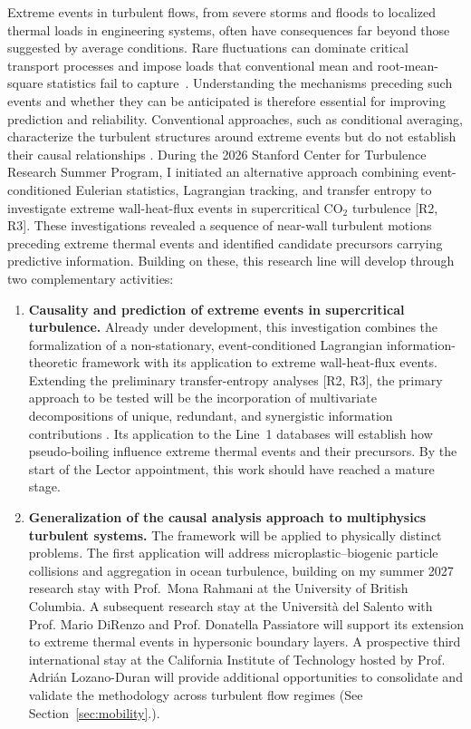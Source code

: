\documentclass[11pt]{article}
\begin{document}
Extreme events in turbulent flows, from severe storms and floods to localized thermal loads in engineering systems, often have consequences far beyond those suggested by average conditions.
Rare fluctuations can dominate critical transport processes and impose loads that conventional mean and root-mean-square statistics fail to capture~\cite{Guerrero2020}.
Understanding the mechanisms preceding such events and whether they can be anticipated is therefore essential for improving prediction and reliability.
Conventional approaches, such as conditional averaging, characterize the turbulent structures around extreme events but do not establish their causal relationships \cite{Hack2021,Zhang2023}.
During the 2026 Stanford Center for Turbulence Research Summer Program, I initiated an alternative approach combining event-conditioned Eulerian statistics, Lagrangian tracking, and transfer entropy to investigate extreme wall-heat-flux events in supercritical CO$_2$ turbulence [R2, R3].
These investigations revealed a sequence of near-wall turbulent motions preceding extreme thermal events and identified candidate precursors carrying predictive information.
Building on these, this research line will develop through two complementary activities:
\begin{enumerate}
	\item \textbf{Causality and prediction of extreme events in supercritical turbulence.}
	Already under development, this investigation combines the formalization of a non-stationary, event-conditioned Lagrangian information-theoretic framework with its application to extreme wall-heat-flux events.
	Extending the preliminary transfer-entropy analyses [R2, R3], the primary approach to be tested will be the incorporation of multivariate decompositions of unique, redundant, and synergistic information contributions \cite{MartinezSanchez2024}.
	Its application to the Line~1 databases will establish how pseudo-boiling influence extreme thermal events and their precursors.
	By the start of the Lector appointment, this work should have reached a mature stage.
	
	\item \textbf{Generalization of the causal analysis approach to multiphysics turbulent systems.}
	The framework will be applied to physically distinct problems.
	The first application will address microplastic--biogenic particle collisions and aggregation in ocean turbulence, building on my summer 2027 research stay with Prof.~Mona Rahmani at the University of British Columbia.
	A subsequent research stay at the Universit\`a del Salento with Prof. Mario DiRenzo and Prof. Donatella Passiatore will support its extension to extreme thermal events in hypersonic boundary layers.
	A prospective third international stay at the  California Institute of Technology hosted by Prof. Adrián Lozano-Duran will provide additional opportunities to consolidate and validate the methodology across turbulent flow regimes (See Section~\ref{sec:mobility}.).
\end{enumerate}
\end{document}
